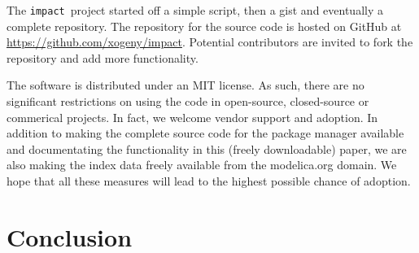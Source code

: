 \documentclass[11pt,a4paper,twocolumn]{article}
\newcommand{\impact}{\texttt{impact}} %
\begin{document}
The \impact\ project started off a simple script, then a gist and
eventually a complete repository.  The repository for the source code
is hosted on GitHub at \url{https://github.com/xogeny/impact}.
Potential contributors are invited to fork the repository and add more
functionality.

The software is distributed under an MIT license.  As such, there are
no significant restrictions on using the code in open-source,
closed-source or commerical projects.  In fact, we welcome vendor
support and adoption.  In addition to making the complete source code
for the package manager available and documentating the functionality
in this (freely downloadable) paper, we are also making the index data
freely available from the modelica.org domain.  We hope that all these
measures will lead to the highest possible chance of adoption.

\section{Conclusion}
\label{sec:conclusion}





\printbibliography
\end{document}
